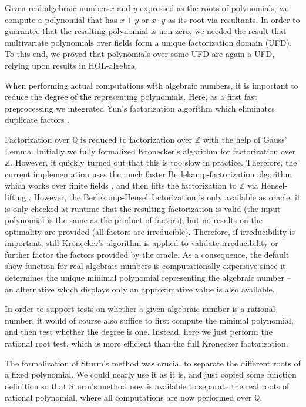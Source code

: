 \documentclass[11pt,a4paper]{article}
\newcommand\rats{\mathbb{Q}}
\newcommand\ints{\mathbb{Z}}
\newcommand\rais{real algebraic numbers\xspace}
\begin{document}
Given \rais $x$ and $y$ expressed as the roots of polynomials,
we compute a polynomial that has $x+y$ or $x \cdot y$ as its root via resultants.
In order to guarantee that the resulting polynomial is non-zero, we needed the result
that multivariate polynomials over fields form a unique factorization domain (UFD).
To this end, we proved that polynomials over some UFD are again a UFD, relying
upon results in HOL-algebra.

When performing actual computations with algebraic numbers, it is important to reduce
the degree of the representing polynomials. Here, as a first fast
preprocessing we integrated Yun's factorization algorithm which eliminates duplicate
factors \cite{Yun}. 

Factorization over $\rats$ is reduced to factorization over $\ints$ 
with the help of Gauss' Lemma.
Initially we fully formalized Kronecker's algorithm for factorization over $\ints$.
However, it quickly turned out that this is too slow in practice. 
Therefore, the current implementation uses
the much faster Berlekamp-factorization algorithm which works over finite fields \cite{Berlekamp}, and
then lifts the factorization to $\ints$ via Hensel-lifting \cite{Hensel}. However, the Berlekamp-Hensel
factorization is only available as oracle: it is only checked at runtime that the resulting
factorization is valid (the input polynomial is the same as the product of factors), 
but no results on the optimality are provided (all factors are irreducible). 
Therefore, if irreducibility is important, still Kronecker's algorithm is applied to validate
irreducibility or further factor the factors provided by the oracle.
As a consequence, the default show-function for real algebraic numbers is computationally expensive
since it determines the unique minimal polynomial representing the algebraic number --
an alternative which displays only an approximative value is also available.

In order to support tests on whether a given algebraic number is a rational number, 
it would of course also suffice to first compute the minimal polynomial, and then test 
whether the degree is one. Instead, here we just perform the rational root test, which
is more efficient than the full Kronecker factorization.

The formalization of Sturm's method \cite{Sturm-AFP} was crucial to separate the different
roots of a fixed polynomial. 
We could nearly use it as it is, and just copied some function definition so
that Sturm's method now is available to separate the real roots of rational polynomial, where
all computations are now performed over $\rats$.
\end{document}
